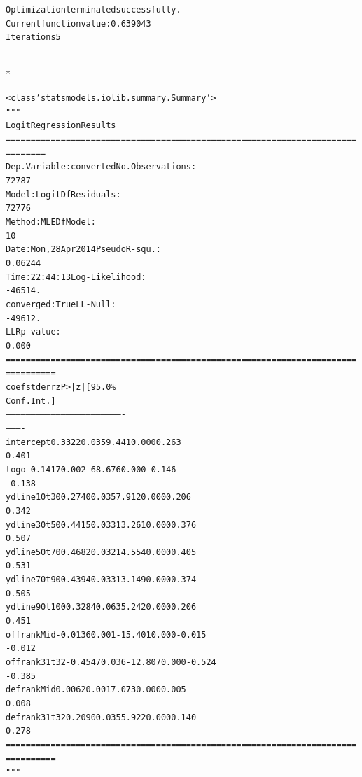 \documentclass[letterpaper,10pt,english]{/anaconda/lib/python2.7/site-packages/sphinx/texinputs/sphinxhowto}
\def\smaller{\fontsize{9.5pt}{9.5pt}\selectfont}
\newenvironment{InvisibleVerbatim}
        {\begin{mdframed}[leftmargin=0.1\linewidth,innerleftmargin=3pt,innerrightmargin=3pt, userdefinedwidth=1\linewidth, linewidth=0pt, linecolor=white, usetwoside=false]}
        {\end{mdframed}}
\begin{document}
        

            
                \begin{InvisibleVerbatim}
                \vspace{-0.5\baselineskip}
\begin{alltt}Optimization terminated successfully.
         Current function value: 0.639043
         Iterations 5
\end{alltt}

            \end{InvisibleVerbatim}
            
                \makebox[0.1\linewidth]{\smaller\hfill\tt\color{nbframe-out-prompt}Out\hspace{4pt}{[}21{]}:\hspace{4pt}}\\*
                \vspace{-2.55\baselineskip}\begin{InvisibleVerbatim}
                \vspace{-0.5\baselineskip}
\begin{alltt}<class 'statsmodels.iolib.summary.Summary'>
"""
                           Logit Regression Results
======================================================================
========
Dep. Variable:              converted   No. Observations:
72787
Model:                          Logit   Df Residuals:
72776
Method:                           MLE   Df Model:
10
Date:                Mon, 28 Apr 2014   Pseudo R-squ.:
0.06244
Time:                        22:44:13   Log-Likelihood:
-46514.
converged:                       True   LL-Null:
-49612.
                                        LLR p-value:
0.000
======================================================================
==========
                   coef    std err          z      P>|z|      [95.0\%
Conf. Int.]
----------------------------------------------------------------------
----------
intercept        0.3322      0.035      9.441      0.000         0.263
0.401
togo            -0.1417      0.002    -68.676      0.000        -0.146
-0.138
ydline10t30      0.2740      0.035      7.912      0.000         0.206
0.342
ydline30t50      0.4415      0.033     13.261      0.000         0.376
0.507
ydline50t70      0.4682      0.032     14.554      0.000         0.405
0.531
ydline70t90      0.4394      0.033     13.149      0.000         0.374
0.505
ydline90t100     0.3284      0.063      5.242      0.000         0.206
0.451
offrankMid      -0.0136      0.001    -15.401      0.000        -0.015
-0.012
offrank31t32    -0.4547      0.036    -12.807      0.000        -0.524
-0.385
defrankMid       0.0062      0.001      7.073      0.000         0.005
0.008
defrank31t32     0.2090      0.035      5.922      0.000         0.140
0.278
======================================================================
==========
"""\end{alltt}

            \end{InvisibleVerbatim}
            
\end{document}

